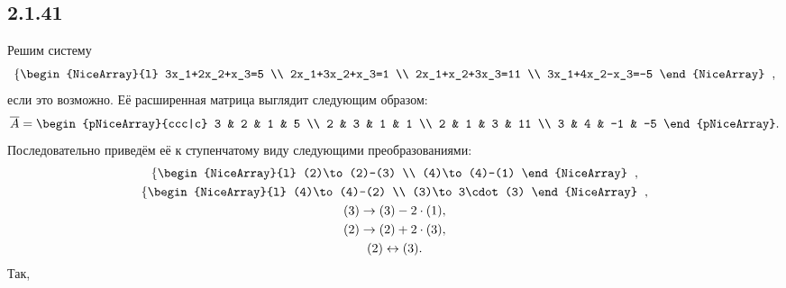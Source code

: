 \subsection{2.1.41}

Решим систему
\[
\left\{
\begin{NiceArray}{l}
	3x_1+2x_2+x_3=5 \\
	2x_1+3x_2+x_3=1 \\
	2x_1+x_2+3x_3=11 \\
	3x_1+4x_2-x_3=-5
\end{NiceArray}
\right.\;,
\]
если это возможно. Её расширенная матрица выглядит следующим образом:
\[
\overline{A}=
\begin{pNiceArray}{ccc|c}
	3 & 2 & 1 & 5 \\
	2 & 3 & 1 & 1 \\
	2 & 1 & 3 & 11 \\
	3 & 4 & -1 & -5
\end{pNiceArray}.
\]
Последовательно приведём её к ступенчатому виду следующими преобразованиями:
\begin{gather*}
\left\{
\begin{NiceArray}{l}
	(2)\to(2)-(3) \\
	(4)\to(4)-(1)
\end{NiceArray}
\right.\;, \\
\left\{
\begin{NiceArray}{l}
	(4)\to(4)-(2) \\
	(3)\to3\cdot(3)
\end{NiceArray}
\right.\;, \\
(3)\to(3)-2\cdot(1), \\
(2)\to(2)+2\cdot(3), \\
(2)\leftrightarrow(3).
\end{gather*}
Так,
